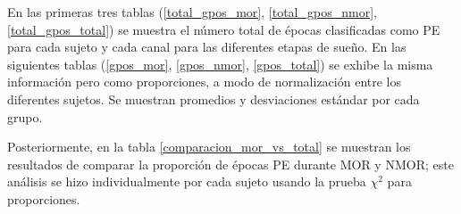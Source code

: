 \documentclass[12pt,a4paper]{mitthesis}
\begin{document}
En las primeras tres tablas (\ref{total_gpos_mor}, \ref{total_gpos_nmor}, \ref{total_gpos_total}) 
se muestra el n\'umero total de \'epocas clasificadas como PE para cada sujeto y cada canal para 
las diferentes etapas de sue\~no. En las siguientes tablas (\ref{gpos_mor}, \ref{gpos_nmor}, 
\ref{gpos_total}) se exhibe la misma informaci\'on pero como proporciones, a modo de 
normalizaci\'on entre los diferentes sujetos. Se muestran promedios y desviaciones est\'andar por 
cada grupo.

Posteriormente, en la tabla \ref{comparacion_mor_vs_total} se muestran los resultados de comparar 
la proporci\'on de \'epocas PE durante MOR y NMOR; este an\'alisis se hizo individualmente por cada
sujeto usando la prueba $\chi^{2}$ para proporciones.

\end{document}
